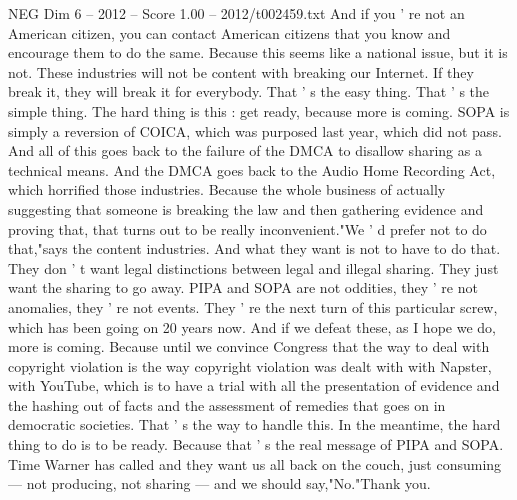 \begin{textsample}{NEG Dim 6 – 2012 – Score 1.00 – 2012/t002459.txt}
And if you ' re not an American citizen, you can contact American citizens that you know and encourage them to do the same.
Because this seems like a national issue, but it is not.
These industries will not be content with breaking our Internet.
If they break it, they will break it for everybody.
That ' s the easy thing.
That ' s the simple thing.
The hard thing is this : get ready, because more is coming.
SOPA is simply a reversion of COICA, which was purposed last year, which did not pass.
And all of this goes back to the failure of the DMCA to disallow sharing as a technical means.
And the DMCA goes back to the Audio Home Recording Act, which horrified those industries.
Because the whole business of actually suggesting that someone is breaking the law and then gathering evidence and proving that, that turns out to be really inconvenient."We ' d prefer not to do that,"says the content industries.
And what they want is not to have to do that.
They don ' t want legal distinctions between legal and illegal sharing.
They just want the sharing to go away.
PIPA and SOPA are not oddities, they ' re not anomalies, they ' re not events.
They ' re the next turn of this particular screw, which has been going on 20 years now.
And if we defeat these, as I hope we do, more is coming.
Because until we convince Congress that the way to deal with copyright violation is the way copyright violation was dealt with with Napster, with YouTube, which is to have a trial with all the presentation of evidence and the hashing out of facts and the assessment of remedies that goes on in democratic societies.
That ' s the way to handle this.
In the meantime, the hard thing to do is to be ready.
Because that ' s the real message of PIPA and SOPA.
Time Warner has called and they want us all back on the couch, just consuming — not producing, not sharing — and we should say,"No."Thank you.

\end{textsample}
